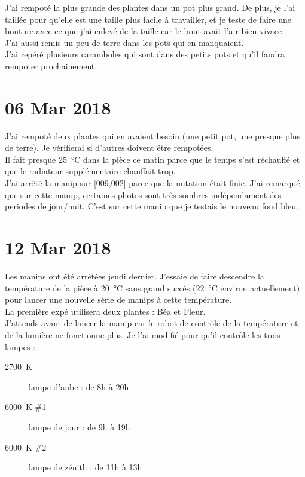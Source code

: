 \documentclass[10pt,a4paper]{article}
\begin{document}
J'ai rempoté la plus grande des plantes dans un pot plus grand. De plus, je l'ai taillée pour qu'elle est une taille plus facile à travailler, et je teste de faire une bouture avec ce que j'ai enlevé de la taille car le bout avait l'air bien vivace.\\
J'ai aussi remis un peu de terre dans les pots qui en manquaient.\\
J'ai repéré plusieurs caramboles qui sont dans des petits pots et qu'il faudra rempoter prochainement.

\section{06 Mar 2018}
J'ai rempoté deux plantes qui en avaient besoin (une petit pot, une presque plus de terre). Je vérifierai si d'autres doivent être rempotées.\\
Il fait presque \SI{25}{\celsius} dans la pièce ce matin parce que le temps s'est réchauffé et que le radiateur supplémentaire chauffait trop.\\

J'ai arrêté la manip sur [009,002] parce que la nutation était finie. J'ai remarqué que sur cette manip, certaines photos sont très sombres indépendament des periodes de jour/nuit. C'est sur cette manip que je testais le nouveau fond bleu.

\section{12 Mar 2018}
Les manips ont été arrêtées jeudi dernier. J'essaie de faire descendre la température de la pièce à \SI{20}{\celsius} sans grand succès (\SI{22}{\celsius} environ actuellement) pour lancer une nouvelle série de manips à cette température. \\
La première expé utilisera deux plantes : Béa et Fleur.\\
J'attends avant de lancer la manip car le robot de contrôle de la température et de la lumière ne fonctionne plus. Je l'ai modifié pour qu'il contrôle les trois lampes :
\begin{description}
    \item [\SI{2700}{\kelvin}] lampe d'aube : de 8h à 20h
    \item [\SI{6000}{\kelvin} \#1] lampe de jour : de 9h à 19h
    \item [\SI{6000}{\kelvin} \#2] lampe de zénith : de 11h à 13h
\end{description}
\end{document}
